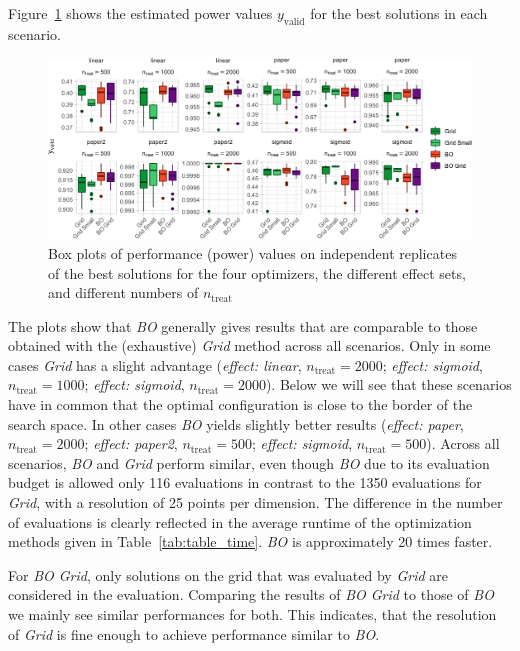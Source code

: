 \documentclass[bimj,fleqn]{w-art}
\theoremstyle{plain}
\theoremstyle{definition}
\begin{document}
Figure~\ref{fig:plot_boxplot_valid_y} shows the estimated power values $y_{\text{valid}}$ for the best solutions in each scenario.
\begin{figure}[htb]
\centering
\includegraphics[width=\linewidth]{generated/figures/plot_boxplot_valid_y.pdf}
\caption{%
  Box plots of performance (power) values on independent replicates of the best solutions for the four optimizers, the different effect sets, and different numbers of $n_{\text{treat}}$
  }
\label{fig:plot_boxplot_valid_y}
\end{figure}
The plots show that \emph{BO} generally gives results that are comparable to those obtained with the (exhaustive) \emph{Grid} method across all scenarios. 
Only in some cases \emph{Grid} has a slight advantage (\emph{effect: linear}, $n_{\text{treat}} = 2000$; \emph{effect: sigmoid}, $n_{\text{treat}} = 1000$; \emph{effect: sigmoid}, $n_{\text{treat}} = 2000$).
Below we will see that these scenarios have in common that the optimal configuration is close to the border of the search space. 
In other cases \emph{BO} yields slightly better results (\emph{effect: paper}, $n_{\text{treat}} = 2000$; \emph{effect: paper2}, $n_{\text{treat}} = 500$; \emph{effect: sigmoid}, $n_{\text{treat}} = 500$).
Across all scenarios, \emph{BO} and \emph{Grid} perform similar, even though \emph{BO} due to its evaluation budget is allowed only 116 evaluations in contrast to the 1350 evaluations for \emph{Grid}, with a resolution of 25 points per dimension. 
The difference in the number of evaluations is clearly reflected in the average runtime of the optimization methods given in Table~\ref{tab:table_time}.
\emph{BO} is approximately 20 times faster.


For \emph{BO Grid}, only solutions on the grid that was evaluated by \emph{Grid} are considered in the evaluation. 
Comparing the results of \emph{BO Grid} to those of \emph{BO} we mainly see similar performances for both.
This indicates, that the resolution of \emph{Grid} is fine enough to achieve performance similar to \emph{BO}.
\end{document}
